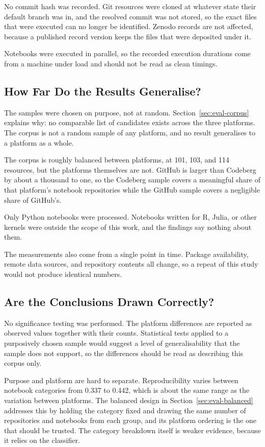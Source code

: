 No commit hash was recorded. Git resources were cloned at whatever state their default branch was in, and the resolved commit was not stored, so the exact files that were executed can no longer be identified. Zenodo records are not affected, because a published record version keeps the files that were deposited under it.

Notebooks were executed in parallel, so the recorded execution durations come from a machine under load and should not be read as clean timings.

\subsection{How Far Do the Results Generalise?}

The samples were chosen on purpose, not at random. Section~\ref{sec:eval-corpus} explains why: no comparable list of candidates exists across the three platforms. The corpus is not a random sample of any platform, and no result generalises to a platform as a whole.

The corpus is roughly balanced between platforms, at 101, 103, and 114 resources, but the platforms themselves are not. GitHub is larger than Codeberg by about a thousand to one, so the Codeberg sample covers a meaningful share of that platform's notebook repositories while the GitHub sample covers a negligible share of GitHub's.

Only Python notebooks were processed. Notebooks written for R, Julia, or other kernels were outside the scope of this work, and the findings say nothing about them.

The measurements also come from a single point in time. Package availability, remote data sources, and repository contents all change, so a repeat of this study would not produce identical numbers.

\subsection{Are the Conclusions Drawn Correctly?}

No significance testing was performed. The platform differences are reported as observed values together with their counts. Statistical tests applied to a purposively chosen sample would suggest a level of generalisability that the sample does not support, so the differences should be read as describing this corpus only.

Purpose and platform are hard to separate. Reproducibility varies between notebook categories from 0.337 to 0.442, which is about the same range as the variation between platforms. The balanced design in Section~\ref{sec:eval-balanced} addresses this by holding the category fixed and drawing the same number of repositories and notebooks from each group, and its platform ordering is the one that should be trusted. The category breakdown itself is weaker evidence, because it relies on the classifier.

